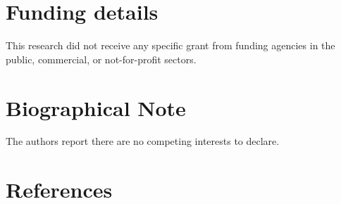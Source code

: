 \documentclass[review, 3p]{elsarticle} %
\begin{document}
\hypertarget{funding-details}{%
\section*{Funding details}\label{funding-details}}

This research did not receive any specific grant from funding agencies in the public, commercial, or not-for-profit sectors.

\hypertarget{biographical-note}{%
\section*{Biographical Note}\label{biographical-note}}

The authors report there are no competing interests to declare.

\hypertarget{references}{%
\section*{References}\label{references}}
\end{document}
